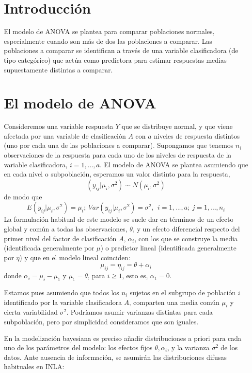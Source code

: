 \documentclass[
]{book}
\begin{document}
\hypertarget{introducciuxf3n-1}{%
\section{Introducción}\label{introducciuxf3n-1}}

El modelo de ANOVA se plantea para comparar poblaciones normales, especialmente cuando son más de dos las poblaciones a comparar. Las poblaciones a comparar se identifican a través de una variable clasificadora (de tipo categórico) que actúa como predictora para estimar respuestas medias supuestamente distintas a comparar.

\hypertarget{el-modelo-de-anova}{%
\section{El modelo de ANOVA}\label{el-modelo-de-anova}}

Consideremos una variable respuesta \(Y\) que se distribuye normal, y que viene afectada por una variable de clasificación \(A\) con \(a\) niveles de respuesta distintos (uno por cada una de las poblaciones a comparar). Supongamos que tenemos \(n_i\) observaciones de la respuesta para cada uno de los niveles de respuesta de la variable clasificadora, \(i=1,...,a\). El modelo de ANOVA se plantea asumiendo que en cada nivel o subpoblación, esperamos un valor distinto para la respuesta,
\[(y_{ij}|\mu_i,\sigma^2) \sim N(\mu_i,\sigma^2)\]
de modo que
\[E(y_{ij}|\mu_i,\sigma^2)=\mu_i; \ Var(y_{ij}|\mu_i,\sigma^2)=\sigma^2, \ \ i=1,...,a; \ j=1,...,n_i\]
La formulación habitual de este modelo se suele dar en términos de un efecto global y común a todas las observaciones, \(\theta\), y un efecto diferencial respecto del primer nivel del factor de clasificación \(A\), \(\alpha_i\), con los que se construye la media (identificada generalmente por \(\mu\)) o predictor lineal (identificada generalmente por \(\eta\)) y que en el modelo lineal coinciden:
\[\mu_{ij}=\eta_{ij}=\theta + \alpha_i\]
donde \(\alpha_i=\mu_i-\mu_1\) y \(\mu_1=\theta\), para \(i\geq 1\), esto es, \(\alpha_1=0\).

Estamos pues asumiendo que todos los \(n_i\) sujetos en el subgrupo de población \(i\) identificado por la variable clasificadora \(A\), comparten una media común \(\mu_i\) y cierta variabilidad \(\sigma^2\). Podríamos asumir varianzas distintas para cada subpoblación, pero por simplicidad consideramos que son iguales.

En la modelización bayesiana es preciso añadir distribuciones a priori para cada uno de los parámetros del modelo: los efectos fijos \(\theta,\alpha_i\), y la varianza \(\sigma^2\) de los datos. Ante ausencia de información, se asumirán las distribuciones difusas habituales en INLA:
\end{document}
